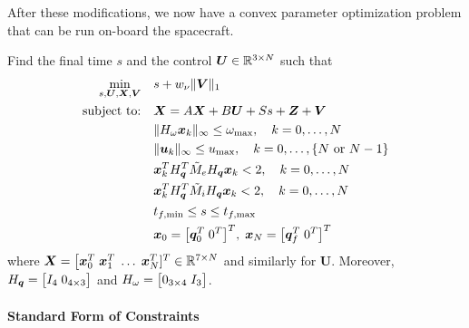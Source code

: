 \documentclass[12pt]{article}
\begin{document}
After these modifications, we now have a convex parameter optimization problem that can be run on-board the spacecraft. 

\begin{problem}
Find the final time $s$ and the control $\bm{U}\in{\mathbb{R}}^{3 \times N}$ such that
\begin{subequations}
\begin{align}
\min_{s,\bm{U},\bm{X},\bm{V}} &\quad s + w_{\nu} \| \bm{V} \|_1 \\
\text{subject to:} &\quad \bm{X} = A \bm{X} + B \bm{U} + S s + \bm{Z} + \bm{V} \\
&\quad \| H_{\omega} \bm{x}_k \|_{\infty} \leq \omega_{\max}, \quad k=0,\ldots,N \\ 
&\quad \| \bm{u}_k \|_{\infty} \leq u_{\max}, \quad k=0,\ldots,\{N \text{ or } N-1\} \\
&\quad \bm{x}_k^T H_{\bm{q}}^T \tilde{M}_e H_{\bm{q}} \bm{x}_k < 2, \quad k=0,\ldots,N \\
&\quad \bm{x}_k^T H_{\bm{q}}^T \tilde{M}_i H_{\bm{q}} \bm{x}_k < 2, \quad k=0,\ldots,N \\
&\quad t_{f,\min} \leq s \leq t_{f,\max} \\
&\quad \bm{x}_0 = \big[ \bm{q}_0^T \; 0^T \big]^T, \; \bm{x}_N = \big[ \bm{q}_f^T \; 0^T \big]^T
\end{align}
\end{subequations}
where $\bm{X} = \big[ \bm{x}_0^T \; \bm{x}_1^T \; \ldots \; \bm{x}_{N}^T ]^T \in {\mathbb{R}}^{7 \times N}$ and similarly for $\bm{U}$. Moreover, $H_{\bm{q}} = \big[ I_{4} \; 0_{4 \times 3} \big]$ and $H_{\omega} = \big[ 0_{3 \times 4} \; I_{3} \big]$.
\end{problem}

\paragraph{Standard Form of Constraints}
\end{document}
